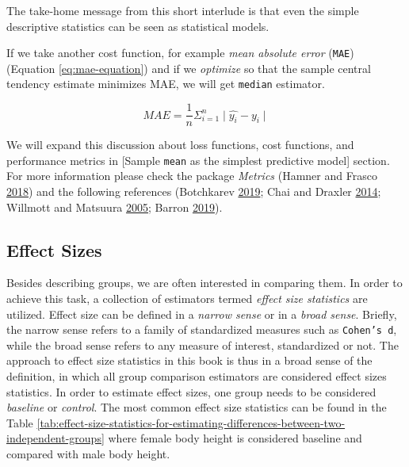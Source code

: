 \documentclass[
]{book}
\begin{document}
The take-home message from this short interlude is that even the simple descriptive statistics can be seen as statistical models.

If we take another cost function, for example \emph{mean absolute error} (\texttt{MAE}) (Equation \eqref{eq:mae-equation}) and if we \emph{optimize} so that the sample central tendency estimate minimizes MAE, we will get \texttt{median} estimator.

\begin{equation}
  MAE = \frac{1}{n}\Sigma_{i=1}^{n}\mid{\hat{y_i} - y_i\mid}
  \label{eq:mae-equation}
\end{equation}

We will expand this discussion about loss functions, cost functions, and performance metrics in {[}Sample \texttt{mean} as the simplest predictive model{]} section. For more information please check the package \emph{Metrics} (Hamner and Frasco \protect\hyperlink{ref-R-Metrics}{2018}) and the following references (Botchkarev \protect\hyperlink{ref-botchkarevNewTypologyDesign2019}{2019}; Chai and Draxler \protect\hyperlink{ref-chaiRootMeanSquare2014}{2014}; Willmott and Matsuura \protect\hyperlink{ref-willmottAdvantagesMeanAbsolute2005}{2005}; Barron \protect\hyperlink{ref-barronGeneralAdaptiveRobust2019}{2019}).

\hypertarget{effect-sizes}{%
\subsection{Effect Sizes}\label{effect-sizes}}

Besides describing groups, we are often interested in comparing them. In order to achieve this task, a collection of estimators termed \emph{effect size statistics} are utilized. Effect size can be defined in a \emph{narrow sense} or in a \emph{broad sense}. Briefly, the narrow sense refers to a family of standardized measures such as \texttt{Cohen’s\ d}, while the broad sense refers to any measure of interest, standardized or not. The approach to effect size statistics in this book is thus in a broad sense of the definition, in which all group comparison estimators are considered effect sizes statistics. In order to estimate effect sizes, one group needs to be considered \emph{baseline} or \emph{control}. The most common effect size statistics can be found in the Table \ref{tab:effect-size-statistics-for-estimating-differences-between-two-independent-groups} where female body height is considered baseline and compared with male body height.
\end{document}
